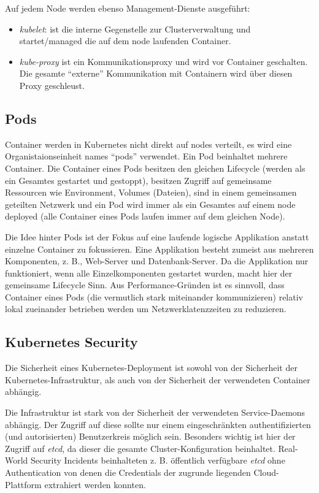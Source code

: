 Auf jedem Node werden ebenso Management-Dienste ausgeführt:

\begin{itemize}
	\item \textit{kubelet}: ist die interne Gegenstelle zur Clusterverwaltung und startet/managed die auf dem node laufenden Container.
	\item \textit{kube-proxy} ist ein Kommunikationsproxy und wird vor Container geschalten. Die gesamte ``externe'' Kommunikation mit Containern wird über diesen Proxy geschleust.
\end{itemize}

\subsection{Pods}

Container werden in Kubernetes nicht direkt auf nodes verteilt, es wird eine Organistaionseinheit names ``pods'' verwendet. Ein Pod beinhaltet mehrere Container. Die Container eines Pods besitzen den gleichen Lifecycle (werden als ein Gesamtes gestartet und gestoppt), besitzen Zugriff auf gemeinsame Ressourcen wie Environment, Volumes (Dateien), sind in einem gemeinsamen geteilten Netzwerk und ein Pod wird immer als ein Gesamtes auf einem node deployed (alle Container eines Pods laufen immer auf dem gleichen Node).

Die Idee hinter Pods ist der Fokus auf eine laufende logische Applikation anstatt einzelne Container zu fokussieren. Eine Applikation besteht zumeist aus mehreren Komponenten, z. B., Web-Server und Datenbank-Server. Da die Applikation nur funktioniert, wenn alle Einzelkomponenten gestartet wurden, macht hier der gemeinsame Lifecycle Sinn. Aus Performance-Gründen ist es sinnvoll, dass Container eines Pods (die vermutlich stark miteinander kommunizieren) relativ lokal zueinander betrieben werden um Netzwerklatenzzeiten zu reduzieren.

\subsection{Kubernetes Security}

Die Sicherheit eines Kubernetes-Deployment ist sowohl von der Sicherheit der Kubernetes-Infrastruktur, als auch von der Sicherheit der verwendeten Container abhängig.

Die Infrastruktur ist stark von der Sicherheit der verwendeten Service-Daemons abhängig. Der Zugriff auf diese sollte nur einem eingeschränkten authentifizierten (und autorisierten) Benutzerkreis möglich sein. Besonders wichtig ist hier der Zugriff auf \textit{etcd}, da dieser die gesamte Cluster-Konfiguration beinhaltet. Real-World Security Incidents beinhalteten z. B. öffentlich verfügbare \textit{etcd} ohne Authentication von denen die Credentials der zugrunde liegenden Cloud-Plattform extrahiert werden konnten.

